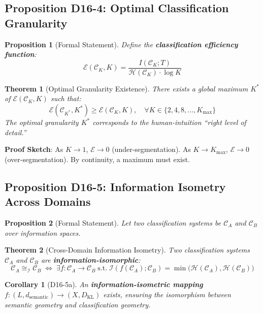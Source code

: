 \documentclass[12pt, a4paper]{article}
\newtheorem{theorem}{Theorem}[section]
\newtheorem{corollary}{Corollary}[section]
\newtheorem{proposition}{Proposition}[section]
\newcommand{\calI}{\mathcal{I}}
\newcommand{\KL}{D_{\mathrm{KL}}}
\newcommand{\ssemd}{d_{\mathrm{semantic}}}
\begin{document}
\subsection{Proposition D16-4: Optimal Classification Granularity}

\begin{proposition}[Formal Statement]
Define the \textbf{classification efficiency function}:
\[
\mathcal{E}(\mathcal{C}_K, K) = \frac{I(\mathcal{C}_K; T)}{\mathcal{H}(\mathcal{C}_K) \cdot \log K}
\]
\end{proposition}

\begin{theorem}[Optimal Granularity Existence]\label{thm:D16-4}
There exists a global maximum $K^*$ of $\mathcal{E}(\mathcal{C}_K, K)$ such that:
\[
\mathcal{E}(\mathcal{C}_{K^*}, K^*) \geq \mathcal{E}(\mathcal{C}_K, K),\quad \forall K \in \{2, 4, 8, \ldots, K_{\max}\}
\]
The optimal granularity $K^*$ corresponds to the human-intuition ``right level of detail.''
\end{theorem}

\textbf{Proof Sketch}: As $K \to 1$, $\mathcal{E} \to 0$ (under-segmentation). As $K \to K_{\max}$, $\mathcal{E} \to 0$ (over-segmentation). By continuity, a maximum must exist.

\subsection{Proposition D16-5: Information Isometry Across Domains}

\begin{proposition}[Formal Statement]
Let two classification systems be $\mathcal{C}_A$ and $\mathcal{C}_B$ over information spaces.
\end{proposition}

\begin{theorem}[Cross-Domain Information Isometry]\label{thm:D16-5}
Two classification systems $\mathcal{C}_A$ and $\mathcal{C}_B$ are \textbf{information-isomorphic}:
\[
\mathcal{C}_A \cong_{\mathcal{I}} \mathcal{C}_B \;\iff\; \exists f: \mathcal{C}_A \to \mathcal{C}_B\;\text{s.t.}\; \calI(f(\mathcal{C}_A); \mathcal{C}_B) = \min\big(\mathcal{H}(\mathcal{C}_A), \mathcal{H}(\mathcal{C}_B)\big)
\]
\end{theorem}

\begin{corollary}[D16-5a]\label{corr:D16-5a}
An \textbf{information-isometric mapping} $f: (L, \ssemd) \to (X, \KL)$ exists, ensuring the isomorphism between semantic geometry and classification geometry.
\end{corollary}
\end{document}
